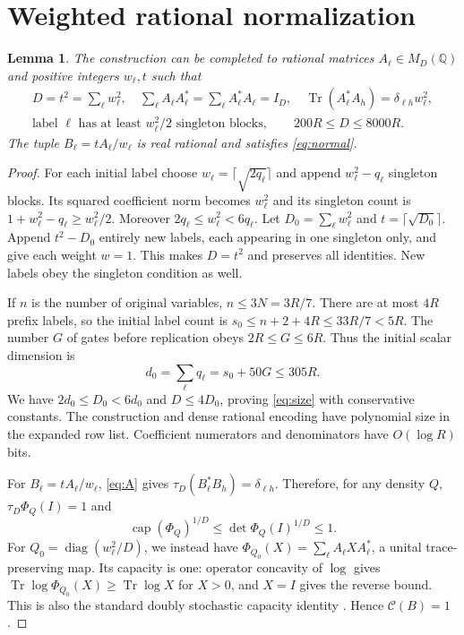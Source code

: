 \documentclass[11pt,a4paper]{article}
\newtheorem{lemma}[theorem]{Lemma}
\newcommand{\Q}{\mathbb Q}
\newcommand{\Tr}{\operatorname{Tr}}
\newcommand{\capop}{\operatorname{cap}}
\newcommand{\K}{\mathcal C}
\begin{document}
\section{Weighted rational normalization}
\begin{lemma}\label{lem:weights}
The construction can be completed to rational matrices $A_\ell\in M_D(\Q)$ and positive integers $w_\ell,t$ such that
\begin{gather}
 D=t^2=\sum_\ell w_\ell^2,\quad
 \sum_\ell A_\ell A_\ell^*=\sum_\ell A_\ell^*A_\ell=I_D,\quad
 \Tr(A_\ell^*A_h)=\delta_{\ell h}w_\ell^2,               \label{eq:A}\\
 \text{label $\ell$ has at least $w_\ell^2/2$ singleton blocks},
 \qquad 200R\le D\le8000R.                             \label{eq:size}
\end{gather}
The tuple $B_\ell=tA_\ell/w_\ell$ is real rational and satisfies \eqref{eq:normal}.
\end{lemma}
\begin{proof}
For each initial label choose $w_\ell=\lceil\sqrt{2q_\ell}\rceil$ and append $w_\ell^2-q_\ell$ singleton blocks. Its squared coefficient norm becomes $w_\ell^2$ and its singleton count is $1+w_\ell^2-q_\ell\ge w_\ell^2/2$. Moreover $2q_\ell\le w_\ell^2<6q_\ell$. Let $D_0=\sum_\ell w_\ell^2$ and $t=\lceil\sqrt{D_0}\rceil$. Append $t^2-D_0$ entirely new labels, each appearing in one singleton only, and give each weight $w=1$. This makes $D=t^2$ and preserves all identities. New labels obey the singleton condition as well.

If $n$ is the number of original variables, $n\le3N=3R/7$. There are at most $4R$ prefix labels, so the initial label count is
$s_0\le n+2+4R\le33R/7<5R$. The number $G$ of gates before replication obeys $2R\le G\le6R$. Thus the initial scalar dimension is
\[
 d_0=\sum_\ell q_\ell=s_0+50G\le305R.
\]
We have $2d_0\le D_0<6d_0$ and $D\le4D_0$, proving \eqref{eq:size} with conservative constants. The construction and dense rational encoding have polynomial size in the expanded row list. Coefficient numerators and denominators have $O(\log R)$ bits.

For $B_\ell=tA_\ell/w_\ell$, \eqref{eq:A} gives $\tau_D(B_\ell^*B_h)=\delta_{\ell h}$. Therefore, for any density $Q$,
$\tau_D\Phi_Q(I)=1$ and
\[
 \capop(\Phi_Q)^{1/D}\le\det\Phi_Q(I)^{1/D}\le1.
\]
For $Q_0=\operatorname{diag}(w_\ell^2/D)$, we instead have
$\Phi_{Q_0}(X)=\sum_\ell A_\ell XA_\ell^*$, a unital trace-preserving map. Its capacity is one: operator concavity of $\log$ gives
$\Tr\log\Phi_{Q_0}(X)\ge\Tr\log X$ for $X>0$, and $X=I$ gives the reverse bound. This is also the standard doubly stochastic capacity identity \cite{ggow}. Hence $\K(B)=1$.
\end{proof}
\end{document}
